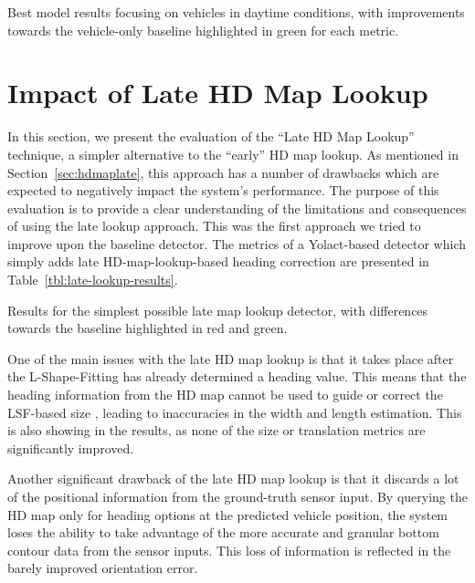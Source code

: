 \begin{table}[htbp]
    
    \caption{Best model results focusing on vehicles in daytime conditions, with improvements towards the vehicle-only baseline highlighted in green for each metric.}
    \label{tbl:best-vehicles}
\end{table}


\section{Impact of Late HD Map Lookup}
\label{sec:impactlatemap}

In this section, we present the evaluation of the \enquote{Late HD Map Lookup} technique, a simpler alternative to the \enquote{early} HD map lookup.
As mentioned in Section~\ref{sec:hdmaplate}, this approach has a number of drawbacks which are expected to negatively impact the system's performance.
The purpose of this evaluation is to provide a clear understanding of the limitations and consequences of using the late lookup approach.
This was the first approach we tried to improve upon the baseline detector.
The metrics of a Yolact-based detector which simply adds late HD-map-lookup-based heading correction are presented in Table~\ref{tbl:late-lookup-results}.

\begin{table}[htbp]
    
    \caption{Results for the simplest possible late map lookup detector, with differences towards the baseline highlighted in red and green.}
    \label{tbl:late-lookup-results}
\end{table}

One of the main issues with the late HD map lookup is that it takes place after the L-Shape-Fitting has already determined a heading value.
This means that the heading information from the HD map cannot be used to guide or correct the LSF-based size , leading to inaccuracies in the width and length estimation.
This is also showing in the results, as none of the size or translation metrics are significantly improved.

Another significant drawback of the late HD map lookup is that it discards a lot of the positional information from the ground-truth sensor input.
By querying the HD map only for heading options at the predicted vehicle position, the system loses the ability to take advantage of the more accurate and granular bottom contour data from the sensor inputs.
This loss of information is reflected in the barely improved orientation error.


